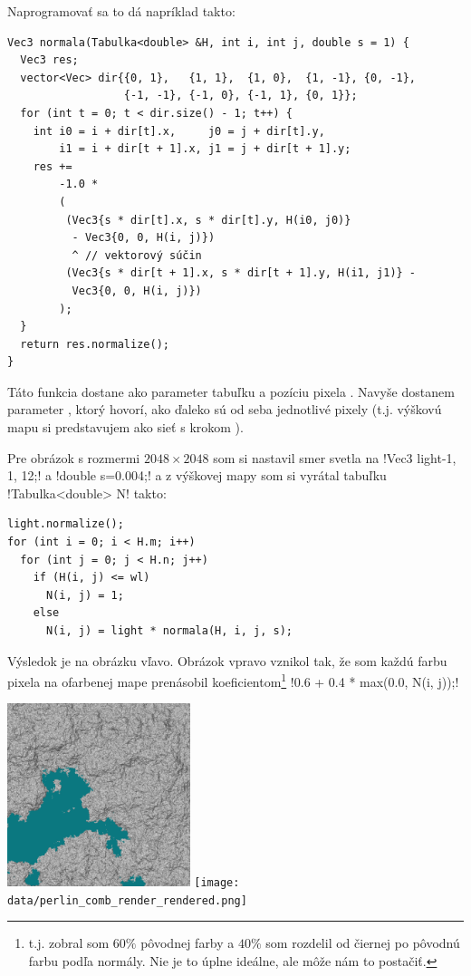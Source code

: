 Naprogramovať sa to dá napríklad takto:


\begin{lstlisting}
Vec3 normala(Tabulka<double> &H, int i, int j, double s = 1) {
  Vec3 res;
  vector<Vec> dir{{0, 1},   {1, 1},  {1, 0},  {1, -1}, {0, -1},
                  {-1, -1}, {-1, 0}, {-1, 1}, {0, 1}};
  for (int t = 0; t < dir.size() - 1; t++) {
    int i0 = i + dir[t].x,     j0 = j + dir[t].y, 
        i1 = i + dir[t + 1].x, j1 = j + dir[t + 1].y;
    res +=
        -1.0 *
        (
         (Vec3{s * dir[t].x, s * dir[t].y, H(i0, j0)} 
          - Vec3{0, 0, H(i, j)}) 
          ^ // vektorový súčin
         (Vec3{s * dir[t + 1].x, s * dir[t + 1].y, H(i1, j1)} -
          Vec3{0, 0, H(i, j)})
        );
  }
  return res.normalize();
}
\end{lstlisting}


Táto funkcia dostane ako parameter tabuľku  a pozíciu pixela .
Navyše dostanem parameter , ktorý hovorí, ako ďaleko sú od seba jednotlivé pixely
(t.j. výškovú mapu si predstavujem ako sieť s krokom ).


Pre obrázok s rozmermi $2048\times2048$ som si nastavil smer svetla na 
\prg!Vec3 light{-1, 1, 12};! a \prg!double s=0.004;! a 
z výškovej mapy  som si vyrátal tabuľku \prg!Tabulka<double> N!
takto:

\begin{lstlisting}
light.normalize();
for (int i = 0; i < H.m; i++)
  for (int j = 0; j < H.n; j++)
    if (H(i, j) <= wl)
      N(i, j) = 1;
    else
      N(i, j) = light * normala(H, i, j, s);
\end{lstlisting}


Výsledok je na obrázku vľavo. Obrázok vpravo vznikol tak, že som každú farbu pixela na ofarbenej mape
prenásobil koeficientom\footnote{%
t.j. zobral som $60\%$ pôvodnej farby a $40\%$ som rozdelil od čiernej po pôvodnú farbu
podľa normály. Nie je to úplne ideálne, ale môže nám to postačiť.
}  \prg!0.6 + 0.4 * max(0.0, N(i, j));!\\


\centerline{
  \includegraphics[width=0.4\textwidth]{data/perlin_comb_render_normal.png}
  \hskip 1cm
  \texttt{[image: data/perlin\_comb\_render\_rendered.png]}
}


